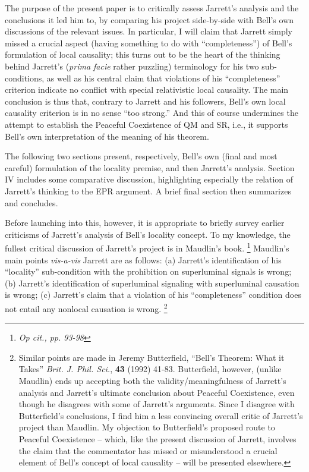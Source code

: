 \documentclass[aps,prc,twocolumn]{revtex4}
\begin{document}
The purpose of the present paper is to critically assess
Jarrett's analysis and
the conclusions it led him to, by comparing his project side-by-side
with Bell's own discussions of the relevant issues.  In particular, I
will claim that Jarrett simply missed a crucial aspect (having
something to do with ``completeness'') of Bell's
formulation of local causality; this turns out to be the heart of the
thinking behind Jarrett's (\emph{prima facie} rather puzzling) terminology
for his two sub-conditions, as well as his central claim that
violations of his ``completeness'' criterion indicate no conflict with
special relativistic local causality.  The main conclusion is thus
that, contrary to Jarrett and his followers, Bell's own local 
causality criterion is in no sense ``too strong.''  And this of course
undermines the attempt to establish the Peaceful Coexistence of QM and
SR, i.e., it supports Bell's own interpretation of the meaning of his
theorem. 

The following two
sections present, respectively, Bell's own (final and most careful)
formulation of the locality premise, and then Jarrett's analysis.  
Section IV includes some comparative discussion, highlighting
especially the relation of Jarrett's thinking to the EPR argument.  A
brief final section then summarizes and concludes.

Before launching into this, however, it is appropriate to briefly
survey earlier criticisms of Jarrett's analysis of Bell's locality
concept.  To my knowledge, the fullest critical discussion of
Jarrett's project is in Maudlin's book. \footnote{\emph{Op cit., 
pp. 93-98}}  
Maudlin's main points \emph{vis-a-vis} Jarrett are as follows:  
(a) Jarrett's identification of his ``locality'' sub-condition with
the prohibition on superluminal signals is wrong; (b) Jarrett's
identification of superluminal signaling with superluminal causation
is wrong; (c) Jarrett's claim that a violation of his ``completeness''
condition does not entail any nonlocal causation is wrong.
\footnote{Similar points are made in Jeremy Butterfield, ``Bell's
  Theorem: What it Takes'' \emph{Brit. J. Phil. Sci.}, {\bf{43}}
  (1992) 41-83.  Butterfield, however, (unlike Maudlin) ends up
  accepting both the validity/meaningfulness of Jarrett's analysis and
  Jarrett's ultimate conclusion about Peaceful Coexistence, 
  even though he disagrees with some of Jarrett's arguments.  Since I
  disagree with Butterfield's conclusions, I find him a less
  convincing overall critic of Jarrett's project than Maudlin.  My
  objection to Butterfield's proposed route to Peaceful Coexistence --
  which, like the present discussion of Jarrett, involves the claim 
  that the commentator has missed or misunderstood a crucial element
  of Bell's concept of local causality -- will be presented elsewhere.}
\end{document}
